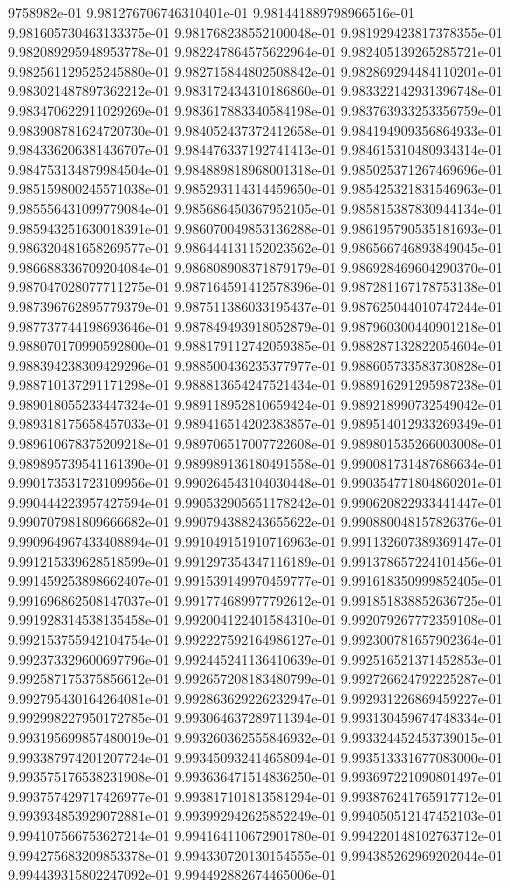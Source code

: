9758982e-01	9.981276706746310401e-01	9.981441889798966516e-01	9.981605730463133375e-01	9.981768238552100048e-01	9.981929423817378355e-01	9.982089295948953778e-01	9.982247864575622964e-01	9.982405139265285721e-01	9.982561129525245880e-01	9.982715844802508842e-01	9.982869294484110201e-01	9.983021487897362212e-01	9.983172434310186860e-01	9.983322142931396748e-01	9.983470622911029269e-01	9.983617883340584198e-01	9.983763933253356759e-01	9.983908781624720730e-01	9.984052437372412658e-01	9.984194909356864933e-01	9.984336206381436707e-01	9.984476337192741413e-01	9.984615310480934314e-01	9.984753134879984504e-01	9.984889818968001318e-01	9.985025371267469696e-01	9.985159800245571038e-01	9.985293114314459650e-01	9.985425321831546963e-01	9.985556431099779084e-01	9.985686450367952105e-01	9.985815387830944134e-01	9.985943251630018391e-01	9.986070049853136288e-01	9.986195790535181693e-01	9.986320481658269577e-01	9.986444131152023562e-01	9.986566746893849045e-01	9.986688336709204084e-01	9.986808908371879179e-01	9.986928469604290370e-01	9.987047028077711275e-01	9.987164591412578396e-01	9.987281167178753138e-01	9.987396762895779379e-01	9.987511386033195437e-01	9.987625044010747244e-01	9.987737744198693646e-01	9.987849493918052879e-01	9.987960300440901218e-01	9.988070170990592800e-01	9.988179112742059385e-01	9.988287132822054604e-01	9.988394238309429296e-01	9.988500436235377977e-01	9.988605733583730828e-01	9.988710137291171298e-01	9.988813654247521434e-01	9.988916291295987238e-01	9.989018055233447324e-01	9.989118952810659424e-01	9.989218990732549042e-01	9.989318175658457033e-01	9.989416514202383857e-01	9.989514012933269349e-01	9.989610678375209218e-01	9.989706517007722608e-01	9.989801535266003008e-01	9.989895739541161390e-01	9.989989136180491558e-01	9.990081731487686634e-01	9.990173531723109956e-01	9.990264543104030448e-01	9.990354771804860201e-01	9.990444223957427594e-01	9.990532905651178242e-01	9.990620822933441447e-01	9.990707981809666682e-01	9.990794388243655622e-01	9.990880048157826376e-01	9.990964967433408894e-01	9.991049151910716963e-01	9.991132607389369147e-01	9.991215339628518599e-01	9.991297354347116189e-01	9.991378657224101456e-01	9.991459253898662407e-01	9.991539149970459777e-01	9.991618350999852405e-01	9.991696862508147037e-01	9.991774689977792612e-01	9.991851838852636725e-01	9.991928314538135458e-01	9.992004122401584310e-01	9.992079267772359108e-01	9.992153755942104754e-01	9.992227592164986127e-01	9.992300781657902364e-01	9.992373329600697796e-01	9.992445241136410639e-01	9.992516521371452853e-01	9.992587175375856612e-01	9.992657208183480799e-01	9.992726624792225287e-01	9.992795430164264081e-01	9.992863629226232947e-01	9.992931226869459227e-01	9.992998227950172785e-01	9.993064637289711394e-01	9.993130459674748334e-01	9.993195699857480019e-01	9.993260362555846932e-01	9.993324452453739015e-01	9.993387974201207724e-01	9.993450932414658094e-01	9.993513331677083000e-01	9.993575176538231908e-01	9.993636471514836250e-01	9.993697221090801497e-01	9.993757429717426977e-01	9.993817101813581294e-01	9.993876241765917712e-01	9.993934853929072881e-01	9.993992942625852249e-01	9.994050512147452103e-01	9.994107566753627214e-01	9.994164110672901780e-01	9.994220148102763712e-01	9.994275683209853378e-01	9.994330720130154555e-01	9.994385262969202044e-01	9.994439315802247092e-01	9.994492882674465006e-01